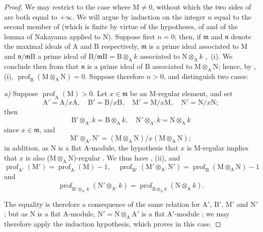 \begin{proof}
We may restrict to the case where $\mathrm{M}\neq 0$, without which the two sides of  are both equal to $+\infty$.
We will argue by induction on the integer $n$ equal to the second member of  (which is finite by virtue of the hypotheses, of  and of the lemma of Nakayama applied to $\mathrm{N}$).
Suppose first $n=0$; then, if $\mathfrak{m}$ and $\mathfrak{n}$ denote the maximal ideals of $\mathrm{A}$ and $\mathrm{B}$ respectively, $\mathfrak{m}$ is a prime ideal associated to $\mathrm{M}$ and $\mathfrak{n}/\mathfrak{m}\mathrm{B}$ a prime ideal of $\mathrm{B}/\mathfrak{m}\mathrm{B}=\mathrm{B}\otimes_\mathrm{A} k$ associated to $\mathrm{N}\otimes_\mathrm{A} k$ ,~(i).
We conclude then from  that $\mathfrak{n}$ is a prime ideal of $\mathrm{B}$ associated to $\mathrm{M}\otimes_\mathrm{A}\mathrm{N}$; hence, by , (i), $\operatorname{prof}_\mathrm{B}(\mathrm{M}\otimes_\mathrm{A}\mathrm{N})=0$.
Suppose therefore $n>0$, and distinguish two cases:

\emph{a)} Suppose $\operatorname{prof}_\mathrm{A}(\mathrm{M})>0$.
Let $x\in\mathfrak{m}$ be an M-regular element, and set
\[
  \mathrm{A}'=\mathrm{A}/x\mathrm{A},\quad\mathrm{B}'=\mathrm{B}/x\mathrm{B},\quad\mathrm{M}'=\mathrm{M}/x\mathrm{M},\quad\mathrm{N}'=\mathrm{N}/x\mathrm{N};
\]
then
\[
  \mathrm{B}'\otimes_{\mathrm{A}'}k=\mathrm{B}\otimes_\mathrm{A} k,\quad \mathrm{N}'\otimes_{\mathrm{A}'}k=\mathrm{N}\otimes_\mathrm{A} k
\]
since $x\in\mathfrak{m}$, and
\[
  \mathrm{M}'\otimes_{\mathrm{A}'}\mathrm{N}'=(\mathrm{M}\otimes_\mathrm{A}\mathrm{N})/x(\mathrm{M}\otimes_\mathrm{A}\mathrm{N});
\]
in addition, as $\mathrm{N}$ is a flat $\mathrm{A}$-module, the hypothesis that $x$ is M-regular implies that $x$ is also ($\mathrm{M}\otimes_\mathrm{A}\mathrm{N}$)-regular .
We thus have , (ii), and 
\[
  \operatorname{prof}_{\mathrm{A}'}(\mathrm{M}')=\operatorname{prof}_\mathrm{A}(\mathrm{M})-1,\quad \operatorname{prof}_{\mathrm{B}'}(\mathrm{M}'\otimes_{\mathrm{A}'}\mathrm{N}')=\operatorname{prof}_\mathrm{B}(\mathrm{M}\otimes_\mathrm{A}\mathrm{N})-1
\]
and
\[
  \operatorname{prof}_{\mathrm{B}'\otimes_{\mathrm{A}'}k}(\mathrm{N}'\otimes_{\mathrm{A}'}k)=\operatorname{prof}_{\mathrm{B}\otimes_\mathrm{A} k}(\mathrm{N}\otimes_\mathrm{A} k).
\]

The equality  is therefore a consequence of the same relation for $\mathrm{A}'$, $\mathrm{B}'$, $\mathrm{M}'$ and $\mathrm{N}'$; but as $\mathrm{N}$ is a flat $\mathrm{A}$-module, $\mathrm{N}'=\mathrm{N}\otimes_\mathrm{A}\mathrm{A}'$ is a flat $\mathrm{A}'$-module ; we may therefore apply the induction hypothesis, which proves  in this case.


\end{proof}
